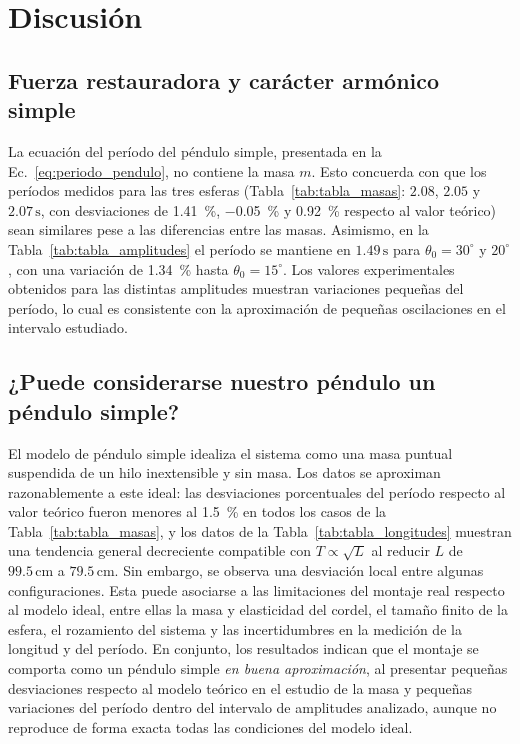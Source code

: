 \section{Discusión}

\subsection{Fuerza restauradora y carácter armónico simple}
La ecuación del período del péndulo simple, presentada en la Ec.~\eqref{eq:periodo_pendulo}, no contiene la masa $m$. Esto concuerda con que los períodos medidos para las tres esferas (Tabla~\ref{tab:tabla_masas}: $2.08$, $2.05$ y $2.07\,\mathrm{s}$, con desviaciones de \SI{1.41}{\percent}, \SI{-0.05}{\percent} y \SI{0.92}{\percent} respecto al valor teórico) sean similares pese a las diferencias entre las masas. Asimismo, en la Tabla~\ref{tab:tabla_amplitudes} el período se mantiene en $1.49\,\mathrm{s}$ para $\theta_0=30^\circ$ y $20^\circ$, con una variación de \SI{1.34}{\percent} hasta $\theta_0=15^\circ$. Los valores experimentales obtenidos para las distintas amplitudes muestran variaciones pequeñas del período, lo cual es consistente con la aproximación de pequeñas oscilaciones en el intervalo estudiado.

\subsection{¿Puede considerarse nuestro péndulo un péndulo simple?}
El modelo de péndulo simple idealiza el sistema como una masa puntual suspendida de un hilo inextensible y sin masa. Los datos se aproximan razonablemente a este ideal: las desviaciones porcentuales del período respecto al valor teórico fueron menores al \SI{1.5}{\percent} en todos los casos de la Tabla~\ref{tab:tabla_masas}, y los datos de la Tabla~\ref{tab:tabla_longitudes} muestran una tendencia general decreciente compatible con $T\propto\sqrt{L}$ al reducir $L$ de $99.5\,\mathrm{cm}$ a $79.5\,\mathrm{cm}$. Sin embargo, se observa una desviación local entre algunas configuraciones. Esta puede asociarse a las limitaciones del montaje real respecto al modelo ideal, entre ellas la masa y elasticidad del cordel, el tamaño finito de la esfera, el rozamiento del sistema y las incertidumbres en la medición de la longitud y del período. En conjunto, los resultados indican que el montaje se comporta como un péndulo simple \emph{en buena aproximación}, al presentar pequeñas desviaciones respecto al modelo teórico en el estudio de la masa y pequeñas variaciones del período dentro del intervalo de amplitudes analizado, aunque no reproduce de forma exacta todas las condiciones del modelo ideal.

